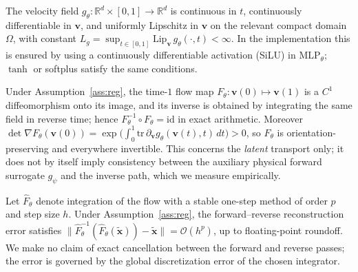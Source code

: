 
\begin{assumption}
\label{ass:reg}
The velocity field $g_\theta:\mathbb{R}^{d}\times[0,1]\to\mathbb{R}^{d}$ is
continuous in $t$, continuously differentiable in $\mathbf{v}$, and uniformly
Lipschitz in $\mathbf{v}$ on the relevant compact domain $\Omega$, with constant
$L_g=\sup_{t\in[0,1]}\mathrm{Lip}_{\mathbf{v}}\,g_\theta(\cdot,t)<\infty$. In the
implementation this is ensured by using a continuously differentiable activation
(SiLU) in $\mathrm{MLP}_\theta$; $\tanh$ or softplus satisfy the same conditions.
\end{assumption}

\begin{proposition}
\label{prop:inv}
Under Assumption~\ref{ass:reg}, the time-$1$ flow map
$F_\theta:\mathbf{v}(0)\mapsto\mathbf{v}(1)$ is a $C^{1}$ diffeomorphism onto its
image, and its inverse is obtained by integrating the same field in reverse
time; hence $F_\theta^{-1}\circ F_\theta=\mathrm{id}$ in exact arithmetic.
Moreover $\det\nabla F_\theta(\mathbf{v}(0))
=\exp\!\big(\int_{0}^{1}\mathrm{tr}\,\partial_{\mathbf{v}}
g_\theta(\mathbf{v}(t),t)\,dt\big)>0$, so $F_\theta$ is orientation-preserving
and everywhere invertible. This concerns the \emph{latent} transport only; it
does not by itself imply consistency between the auxiliary physical forward
surrogate $g_\psi$ and the inverse path, which we measure empirically.
\end{proposition}

\begin{proposition}
\label{prop:num}
Let $\widehat{F}_\theta$ denote integration of the flow with a stable one-step
method of order $p$ and step size $h$. Under Assumption~\ref{ass:reg}, the
forward--reverse reconstruction error satisfies
$\lVert \widehat{F}_\theta^{-1}(\widehat{F}_\theta(\tilde{\mathbf{x}}))
-\tilde{\mathbf{x}}\rVert=\mathcal{O}(h^{p})$, up to floating-point roundoff. We
make no claim of exact cancellation between the forward and reverse passes; the
error is governed by the global discretization error of the chosen integrator.
\end{proposition}

